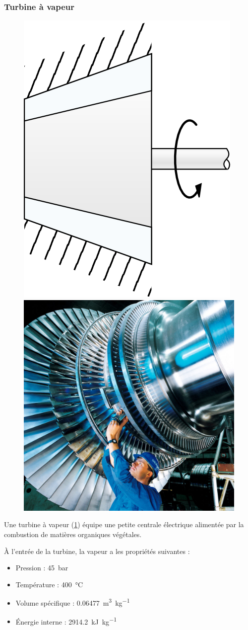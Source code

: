 \subsubsection{Turbine à vapeur}
\label{exo_turbine_vapeur}

	\begin{figure}
		\begin{center}
			\includegraphics[height=0.45\textwidth, max height=0.5\columnwidth]{images/symbole_turbine.png}
			\hspace{0.5cm}
			\includegraphics[height=0.45\textwidth, max height=0.5\columnwidth]{images/steam_turbine_siemens.jpg}
		\end{center}
		\label{fig_turbine_vapeur}
	\end{figure}
	
	Une turbine à vapeur (\cref{fig_turbine_vapeur}) équipe une petite centrale électrique alimentée par la combustion de matières organiques végétales.
	
	À l’entrée de la turbine, la vapeur a les propriétés suivantes :
		
	\begin{itemize}
		\item Pression : 		\tab \SI{45}{\bar}
		\item Température : 	\tab \SI{400}{\degreeCelsius}
		\item Volume spécifique : 	\tab \SI{0,06477}{\metre\cubed\per\kilogram}
		\item Énergie interne : 	\tab \SI{2914,2}{\kilo\joule\per\kilogram}
	\end{itemize}
	
